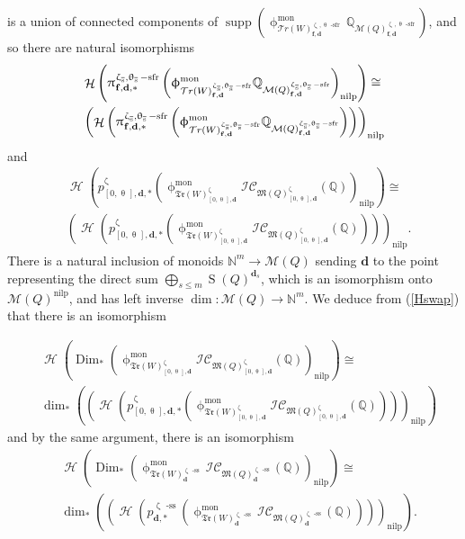 \documentclass[a4paper,10pt]{amsart}
\newcommand{\dd}{\mathbf{d}}
\newcommand{\ff}{\mathbf{f}}
\DeclareMathOperator{\Simp}{S}
\DeclareMathOperator{\sfr}{-sfr}
\newcommand{\WW}{\mathcal{T}r(W)}
\newcommand{\WWW}{\mathfrak{Tr}(W)}
\newcommand{\Mst}{\mathfrak{M}}
\newcommand{\Msp}{\mathcal{M}}
\newcommand{\ICS}{\mathcal{IC}}
\newcommand{\phim}[1]{\phi^{\mon}_{#1}}
\renewcommand{\theta}{\uptheta}
\renewcommand{\zeta}{\upzeta}
\renewcommand{\pi}{\uppi\hspace{0.05em}}
\renewcommand{\phi}{\upphi}
\DeclareMathOperator{\sst}{-ss}
\DeclareMathOperator{\nilp}{nilp}
\DeclareMathOperator{\Dim}{Dim}
\DeclareMathOperator{\mon}{mon}
\DeclareMathOperator{\supp}{supp}
\DeclareMathOperator{\Ss}{\overline{s}}
\DeclareMathOperator{\Ho}{\mathcal{H}}
\begin{document}
is a union of connected components of $\supp\left(\phim{\WW_{\ff,\dd}^{\zeta_{\Ss},\theta_{\Ss}\sfr}}\mathbb{Q}_{\Msp(Q)_{\ff,\dd}^{\zeta_{\Ss},\theta_{\Ss}\sfr}}\right)$, and so there are natural isomorphisms
\begin{align*}
&\Ho\left( \pi^{\zeta_{\Ss},\theta_{\Ss}\sfr}_{\ff,\dd,*}\left( \phim{\WW_{\ff,\dd}^{\zeta_{\Ss},\theta_{\Ss}\sfr}}\mathbb{Q}_{\Msp(Q)_{\ff,\dd}^{\zeta_{\Ss},\theta_{\Ss}\sfr}}\right)_{\nilp}\right)\cong
\\&\left(\Ho\left( \pi^{\zeta_{\Ss},\theta_{\Ss}\sfr}_{\ff,\dd,*}\left( \phim{\WW_{\ff,\dd}^{\zeta_{\Ss},\theta_{\Ss}\sfr}}\mathbb{Q}_{\Msp(Q)_{\ff,\dd}^{\zeta_{\Ss},\theta_{\Ss}\sfr}}\right)\right)\right)_{\nilp}
\end{align*}
and
\begin{align}\label{Hswap}
&\Ho\left(p_{[0,\theta_{\Ss}],\dd,*}^{\zeta_{\Ss}}\left(\phim{\WWW^{\zeta_{\Ss}}_{[0,\theta_{\Ss}],\dd}}\ICS_{\Mst(Q)^{\zeta_{\Ss}}_{[0,\theta_{\Ss}],\dd}}(\mathbb{Q})\right)_{\nilp}\right)\cong
\\&\left(\Ho\left(p_{[0,\theta_{\Ss}],\dd,*}^{\zeta_{\Ss}}\left(\phim{\WWW^{\zeta_{\Ss}}_{[0,\theta_{\Ss}],\dd}}\ICS_{\Mst(Q)^{\zeta_{\Ss}}_{[0,\theta_{\Ss}],\dd}}(\mathbb{Q})\right)\right)\right)_{\nilp}.\nonumber
\end{align}
There is a natural inclusion of monoids $\mathbb{N}^m\rightarrow \Msp(Q)$ sending $\dd$ to the point representing the direct sum $\bigoplus_{s\leq m}\Simp(Q)^{\dd_s}$, which is an isomorphism onto $\Msp(Q)^{\nilp}$, and has left inverse $\dim\colon\Msp(Q)\rightarrow\mathbb{N}^m$.
We deduce from (\ref{Hswap}) that there is an isomorphism

\begin{align}\label{nilpCom}
&\Ho\left(\Dim_*\left(\phim{\WWW^{\zeta_{\Ss}}_{[0,\theta_{\Ss}],\dd}}\ICS_{\Mst(Q)^{\zeta_{\Ss}}_{[0,\theta_{\Ss}],\dd}}(\mathbb{Q})\right)_{\nilp}\right)\cong \\&\dim_*\left(\left(\Ho\left(p_{[0,\theta_{\Ss}],\dd,*}^{\zeta_{\Ss}}\left(\phim{\WWW^{\zeta_{\Ss}}_{[0,\theta_{\Ss}],\dd}}\ICS_{\Mst(Q)^{\zeta_{\Ss}}_{[0,\theta_{\Ss}],\dd}}(\mathbb{Q})\right)\right)\right)_{\nilp}\right)\nonumber
\end{align}
and by the same argument, there is an isomorphism
\begin{align}\label{nilpCom2}
&\Ho\left(\Dim_*\left(\phim{\WWW^{\zeta_{\Ss}\sst}_{\dd}}\ICS_{\Mst(Q)^{\zeta_{\Ss}\sst}_{\dd}}(\mathbb{Q})\right)_{\nilp}\right)\cong \\&\dim_*\left(\left(\Ho\left(p_{\dd,*}^{\zeta_{\Ss}\sst}\left(\phim{\WWW^{\zeta_{\Ss}\sst}_{\dd}}\ICS_{\Mst(Q)^{\zeta_{\Ss}\sst}_{\dd}}(\mathbb{Q})\right)\right)\right)_{\nilp}\right).\nonumber
\end{align}
 
\end{document}
